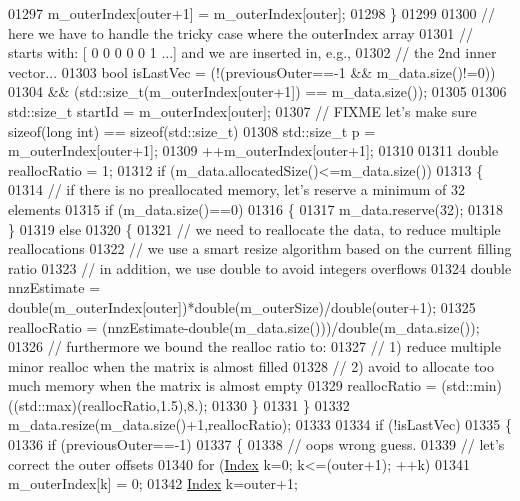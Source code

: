 \begin{DoxyCode}
01297     m\_outerIndex[outer+1] = m\_outerIndex[outer];
01298   \}
01299 
01300   \textcolor{comment}{// here we have to handle the tricky case where the outerIndex array}
01301   \textcolor{comment}{// starts with: [ 0 0 0 0 0 1 ...] and we are inserted in, e.g.,}
01302   \textcolor{comment}{// the 2nd inner vector...}
01303   \textcolor{keywordtype}{bool} isLastVec = (!(previousOuter==-1 && m\_data.size()!=0))
01304                 && (std::size\_t(m\_outerIndex[outer+1]) == m\_data.size());
01305 
01306   std::size\_t startId = m\_outerIndex[outer];
01307   \textcolor{comment}{// FIXME let's make sure sizeof(long int) == sizeof(std::size\_t)}
01308   std::size\_t p = m\_outerIndex[outer+1];
01309   ++m\_outerIndex[outer+1];
01310 
01311   \textcolor{keywordtype}{double} reallocRatio = 1;
01312   \textcolor{keywordflow}{if} (m\_data.allocatedSize()<=m\_data.size())
01313   \{
01314     \textcolor{comment}{// if there is no preallocated memory, let's reserve a minimum of 32 elements}
01315     \textcolor{keywordflow}{if} (m\_data.size()==0)
01316     \{
01317       m\_data.reserve(32);
01318     \}
01319     \textcolor{keywordflow}{else}
01320     \{
01321       \textcolor{comment}{// we need to reallocate the data, to reduce multiple reallocations}
01322       \textcolor{comment}{// we use a smart resize algorithm based on the current filling ratio}
01323       \textcolor{comment}{// in addition, we use double to avoid integers overflows}
01324       \textcolor{keywordtype}{double} nnzEstimate = double(m\_outerIndex[outer])*double(m\_outerSize)/double(outer+1);
01325       reallocRatio = (nnzEstimate-double(m\_data.size()))/double(m\_data.size());
01326       \textcolor{comment}{// furthermore we bound the realloc ratio to:}
01327       \textcolor{comment}{//   1) reduce multiple minor realloc when the matrix is almost filled}
01328       \textcolor{comment}{//   2) avoid to allocate too much memory when the matrix is almost empty}
01329       reallocRatio = (std::min)((std::max)(reallocRatio,1.5),8.);
01330     \}
01331   \}
01332   m\_data.resize(m\_data.size()+1,reallocRatio);
01333 
01334   \textcolor{keywordflow}{if} (!isLastVec)
01335   \{
01336     \textcolor{keywordflow}{if} (previousOuter==-1)
01337     \{
01338       \textcolor{comment}{// oops wrong guess.}
01339       \textcolor{comment}{// let's correct the outer offsets}
01340       \textcolor{keywordflow}{for} (\hyperlink{group___core___module_a554f30542cc2316add4b1ea0a492ff02}{Index} k=0; k<=(outer+1); ++k)
01341         m\_outerIndex[k] = 0;
01342       \hyperlink{group___core___module_a554f30542cc2316add4b1ea0a492ff02}{Index} k=outer+1;

\end{DoxyCode}
